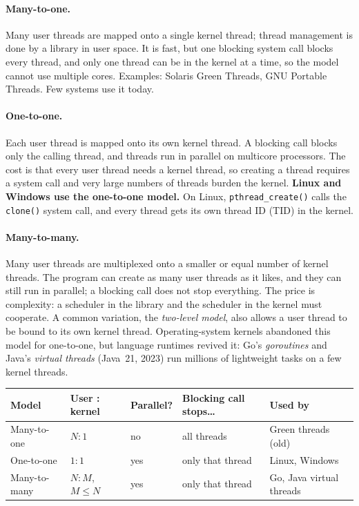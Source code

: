 \documentclass[11pt,a4paper]{article}
\newcommand{\cmd}[1]{\texttt{#1}}
\begin{document}
\paragraph{Many-to-one.} Many user threads are mapped onto a single kernel thread; thread management is done by a library in user space. It is fast, but one blocking system call blocks every thread, and only one thread can be in the kernel at a time, so the model cannot use multiple cores. Examples: Solaris Green Threads, GNU Portable Threads. Few systems use it today.

\paragraph{One-to-one.} Each user thread is mapped onto its own kernel thread. A blocking call blocks only the calling thread, and threads run in parallel on multicore processors. The cost is that every user thread needs a kernel thread, so creating a thread requires a system call and very large numbers of threads burden the kernel. \textbf{Linux and Windows use the one-to-one model.} On Linux, \cmd{pthread\_create()} calls the \cmd{clone()} system call, and every thread gets its own thread ID (TID) in the kernel.

\paragraph{Many-to-many.} Many user threads are multiplexed onto a smaller or equal number of kernel threads. The program can create as many user threads as it likes, and they can still run in parallel; a blocking call does not stop everything. The price is complexity: a scheduler in the library and the scheduler in the kernel must cooperate. A common variation, the \emph{two-level model}, also allows a user thread to be bound to its own kernel thread. Operating-system kernels abandoned this model for one-to-one, but language runtimes revived it: Go's \emph{goroutines} and Java's \emph{virtual threads} (Java~21, 2023) run millions of lightweight tasks on a few kernel threads.

\begin{center}
\renewcommand{\arraystretch}{1.3}
\begin{tabular}{@{}lllll@{}}
\toprule
\textbf{Model} & \textbf{User : kernel} & \textbf{Parallel?} & \textbf{Blocking call stops\dots} & \textbf{Used by} \\
\midrule
Many-to-one & $N:1$ & no & all threads & Green threads (old) \\
One-to-one & $1:1$ & yes & only that thread & Linux, Windows \\
Many-to-many & $N:M$, $M\le N$ & yes & only that thread & Go, Java virtual threads \\
\bottomrule
\end{tabular}
\end{center}
\end{document}
